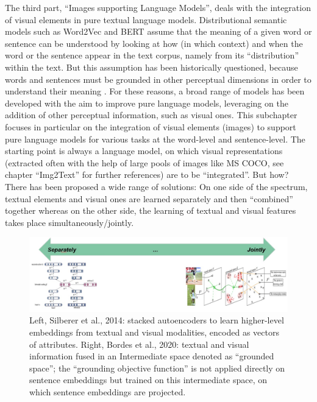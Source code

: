\documentclass[
]{krantz}
\begin{document}
The third part, ``Images supporting Language Models'', deals with the integration of visual elements in pure textual language models.
Distributional semantic models such as Word2Vec and BERT assume that the meaning of a given word or sentence can be understood by looking at how (in which context) and when the word or the sentence appear in the text corpus, namely from its ``distribution'' within the text.
But this assumption has been historically questioned, because words and sentences must be grounded in other perceptual dimensions in order to understand their meaning \citep[see for example the ``symbol grounding problem'';][]{harnad1990symbol}.
For these reasons, a broad range of models has been developed with the aim to improve pure language models, leveraging on the addition of other perceptual information, such as visual ones.
This subchapter focuses in particular on the integration of visual elements (images) to support pure language models for various tasks at the word-level and sentence-level.
The starting point is always a language model, on which visual representations (extracted often with the help of large pools of images like MS COCO, see chapter ``Img2Text'' for further references) are to be ``integrated''.
But how?
There has been proposed a wide range of solutions:
On one side of the spectrum, textual elements and visual ones are learned separately and then ``combined'' together whereas on the other side, the learning of textual and visual features takes place simultaneously/jointly.

\begin{figure}

{\centering \includegraphics[width=1\linewidth]{figures/02-chapter2/Img_Ch_Intro} 

}

\caption{Left, Silberer et al., 2014: stacked autoencoders to learn higher-level embeddings from textual and visual modalities, encoded as vectors of attributes. Right, Bordes et al., 2020: textual and visual information fused in an Intermediate space denoted as “grounded space”; the “grounding objective function” is not applied directly on sentence embeddings but trained on this intermediate space, on which sentence embeddings are projected.}\label{fig:unnamed-chunk-1}
\end{figure}
\end{document}
